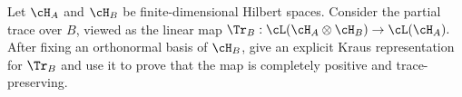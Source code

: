 Let $\cH_A$ and $\cH_B$ be finite-dimensional Hilbert spaces. Consider the partial trace over $B$, viewed as the linear map $\Tr_B: \cL(\cH_A\otimes\cH_B) \to \cL(\cH_A).$
After fixing an orthonormal basis of $\cH_B$, give an explicit Kraus representation for $\Tr_B$ and use it to prove that the map is completely positive and trace-preserving.
